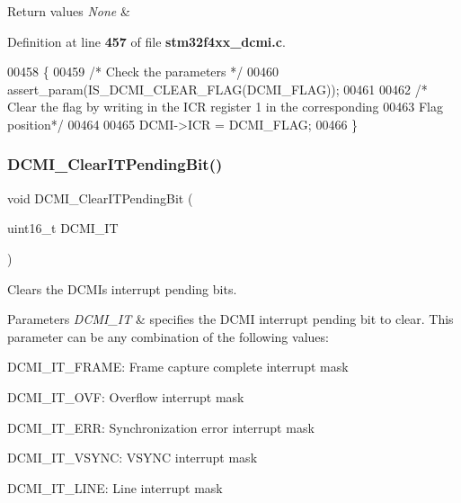 \begin{DoxyRetVals}{Return values}
{\em None} & \\
\hline
\end{DoxyRetVals}


Definition at line \textbf{ 457} of file \textbf{ stm32f4xx\+\_\+dcmi.\+c}.


\begin{DoxyCode}
00458 \{
00459   \textcolor{comment}{/* Check the parameters */}
00460   assert_param(IS_DCMI_CLEAR_FLAG(DCMI\_FLAG));
00461   
00462   \textcolor{comment}{/* Clear the flag by writing in the ICR register 1 in the corresponding }
00463 \textcolor{comment}{  Flag position*/}
00464   
00465   DCMI->ICR = DCMI\_FLAG;
00466 \}
\end{DoxyCode}
\mbox{\label{group__DCMI__Group3_ga908e6dad7bc5f4f4bbc512f679222c55}} 
\subsubsection{D\+C\+M\+I\+\_\+\+Clear\+I\+T\+Pending\+Bit()}
{\footnotesize\ttfamily void D\+C\+M\+I\+\_\+\+Clear\+I\+T\+Pending\+Bit (\begin{DoxyParamCaption}\item[{uint16\+\_\+t}]{D\+C\+M\+I\+\_\+\+IT }\end{DoxyParamCaption})}



Clears the D\+C\+MI\textquotesingle{}s interrupt pending bits. 


\begin{DoxyParams}{Parameters}
{\em D\+C\+M\+I\+\_\+\+IT} & specifies the D\+C\+MI interrupt pending bit to clear. This parameter can be any combination of the following values\+: \begin{DoxyItemize}
\item D\+C\+M\+I\+\_\+\+I\+T\+\_\+\+F\+R\+A\+ME\+: Frame capture complete interrupt mask \item D\+C\+M\+I\+\_\+\+I\+T\+\_\+\+O\+VF\+: Overflow interrupt mask \item D\+C\+M\+I\+\_\+\+I\+T\+\_\+\+E\+RR\+: Synchronization error interrupt mask \item D\+C\+M\+I\+\_\+\+I\+T\+\_\+\+V\+S\+Y\+NC\+: V\+S\+Y\+NC interrupt mask \item D\+C\+M\+I\+\_\+\+I\+T\+\_\+\+L\+I\+NE\+: Line interrupt mask \end{DoxyItemize}
\\
\hline
\end{DoxyParams}

